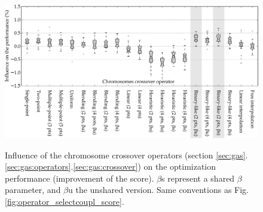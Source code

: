 \documentclass{ametsoc}
\begin{document}
\begin{figure}[t]
	\begin{center}
		\noindent\includegraphics[width=39pc,angle=0]{fig06.pdf}\\
	\end{center}
	\caption{Influence of the chromosome crossover operators (section \ref{sec:gas}.\ref{sec:gas:operators}.\ref{sec:gas:crossover}) on the optimization performance (improvement of the score).  $\beta$s represent a shared $\beta$ parameter, and $\beta$u the unshared version. Same conventions as Fig. \ref{fig:operator_selectcoupl_score}.}
	\label{fig:operator_crossover_score}
\end{figure}
\end{document}
